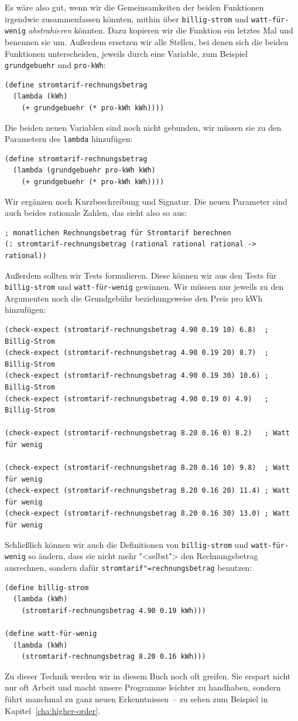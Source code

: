 Es wäre also gut, wenn wir die Gemeinsamkeiten der beiden Funktionen
irgendwie zusammenfassen könnten, mithin über \texttt{billig-strom}
und \texttt{watt-für-wenig} \textit{abstrahieren}
könnten.  Dazu kopieren wir die Funktion ein letztes Mal und benennen
sie um.  Außerdem ersetzen wir alle Stellen, bei denen sich die beiden
Funktionen unterscheiden, jeweils durch eine Variable, zum Beispiel
\texttt{grundgebuehr} und \texttt{pro-kWh}:
%
\begin{verbatim}
(define stromtarif-rechnungsbetrag
  (lambda (kWh)
    (+ grundgebuehr (* pro-kWh kWh))))
\end{verbatim}
%
Die beiden neuen Variablen sind noch nicht gebunden, wir müssen sie zu
den Parametern des \texttt{lambda} hinzufügen:
%
\begin{verbatim}
(define stromtarif-rechnungsbetrag
  (lambda (grundgebuehr pro-kWh kWh)
    (+ grundgebuehr (* pro-kWh kWh))))
\end{verbatim}
%
Wir ergänzen noch Kurzbeschreibung und Signatur.  Die neuen Parameter
sind auch beides rationale Zahlen, das sieht also so aus:
%
\begin{verbatim}
; monatlichen Rechnungsbetrag für Stromtarif berechnen
(: stromtarif-rechnungsbetrag (rational rational rational -> rational))
\end{verbatim}
%
Außerdem sollten wir Tests formulieren.  Diese können wir aus den
Tests für \texttt{billig-strom} und \texttt{watt-für-wenig} gewinnen.
Wir müssen nur jeweils zu den Argumenten noch die Grundgebühr
beziehungsweise den Preis pro kWh hinzufügen:
%
\begin{verbatim}
(check-expect (stromtarif-rechnungsbetrag 4.90 0.19 10) 6.8)  ; Billig-Strom
(check-expect (stromtarif-rechnungsbetrag 4.90 0.19 20) 8.7)  ; Billig-Strom
(check-expect (stromtarif-rechnungsbetrag 4.90 0.19 30) 10.6) ; Billig-Strom
(check-expect (stromtarif-rechnungsbetrag 4.90 0.19 0) 4.9)   ; Billig-Strom

(check-expect (stromtarif-rechnungsbetrag 8.20 0.16 0) 8.2)   ; Watt für wenig

(check-expect (stromtarif-rechnungsbetrag 8.20 0.16 10) 9.8)  ; Watt für wenig
(check-expect (stromtarif-rechnungsbetrag 8.20 0.16 20) 11.4) ; Watt für wenig
(check-expect (stromtarif-rechnungsbetrag 8.20 0.16 30) 13.0) ; Watt für wenig
\end{verbatim}
%
Schließlich können wir auch die Definitionen von \texttt{billig-strom}
und \texttt{watt-für-wenig} so ändern, dass sie nicht mehr "<selbst">
den Rechnungsbetrag ausrechnen, sondern dafür
\texttt{stromtarif"=rechnungsbetrag} benutzen:
%
\begin{verbatim}
(define billig-strom
  (lambda (kWh)
    (stromtarif-rechnungsbetrag 4.90 0.19 kWh)))

(define watt-für-wenig
  (lambda (kWh)
    (stromtarif-rechnungsbetrag 8.20 0.16 kWh)))
\end{verbatim}
%
Zu dieser Technik werden wir in diesem Buch noch oft greifen.  Sie
erspart nicht nur oft Arbeit und macht unsere Programme leichter zu
handhaben, sondern führt manchmal zu ganz neuen Erkenntnissen~--
zu sehen zum Beispiel in Kapitel~\ref{cha:higher-order}.

